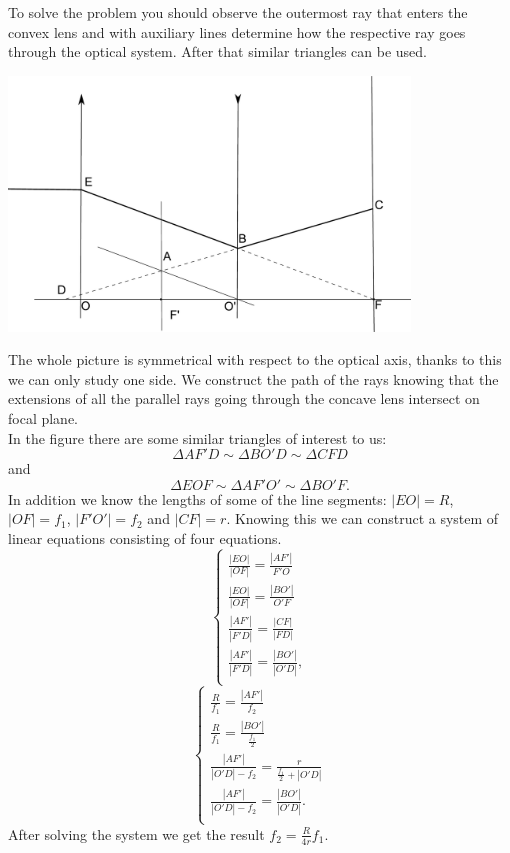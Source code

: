 \hinteng
To solve the problem you should observe the outermost ray that enters the convex lens and with auxiliary lines determine how the respective ray goes through the optical system. After that similar triangles can be used.

\solueng
\begin{center}
	\includegraphics[width=0.8\textwidth]{2013-v3g-01-laats_lah2}\\
\end{center}
The whole picture is symmetrical with respect to the optical axis, thanks to this we can only study one side. We construct the path of the rays knowing that the extensions of all the parallel rays going through the concave lens intersect on focal plane.\\
In the figure there are some similar triangles of interest to us:
$$\Delta AF'D \sim \Delta BO'D \sim \Delta CFD$$ 
and 
$$\Delta EOF \sim \Delta AF'O' \sim \Delta BO'F.$$ 
In addition we know the lengths of some of the line segments: $|EO| = R$, $|OF| = f_1$, $|F'O'| = f_2$ and $|CF| = r$. Knowing this we can construct a system of linear equations consisting of four equations.
\[ 
\begin{cases}
\frac{|EO|}{|OF|} = \frac{|AF'|}{F'O}\\
\frac{|EO|}{|OF|} = \frac{|BO'|}{O'F}\\
\frac{|AF'|}{|F'D|} = \frac{|CF|}{|FD|}\\
\frac{|AF'|}{|F'D|} = \frac{|BO'|}{|O'D|},\\
\end{cases}
\] 
\[ 
\begin{cases}
\frac{R}{f_1} = \frac{|AF'|}{f_2}\\
\frac{R}{f_1} = \frac{|BO'|}{\frac{f_1}{2}}\\
\frac{|AF'|}{|O'D| - f_2} = \frac{r}{\frac{f_1}{2} + |O'D|}\\
\frac{|AF'|}{|O'D| - f_2} = \frac{|BO'|}{|O'D|}.\\
\end{cases}
\]
After solving the system we get the result $f_2 = \frac{R}{4r}f_1$.\\

